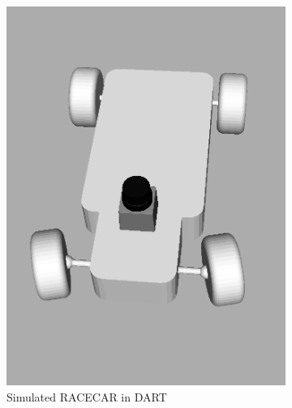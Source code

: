 \documentclass{article}
\begin{document}
\begin{figure}
 \begin{subfigure}[b]{0.48\textwidth}
   \includegraphics[width=1\linewidth]{figs/racecar_sim.png}
   \caption{Simulated RACECAR in DART}
   \label{subfig:simcar}
 \end{subfigure}
 \hfill
 \begin{subfigure}[b]{0.49\textwidth}

\end{subfigure}
\end{figure}
\end{document}

